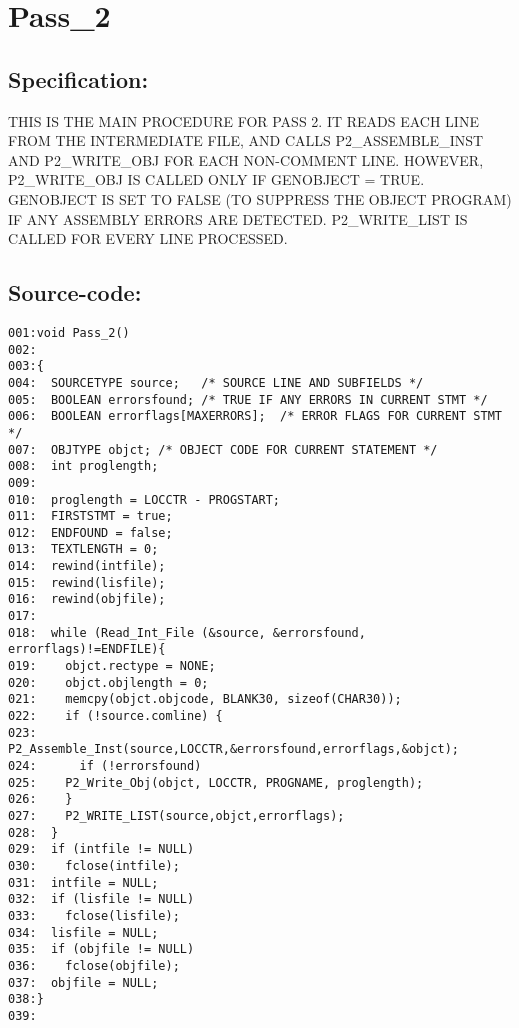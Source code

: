\section{Pass\_2}
\subsection*{Specification:}
THIS IS THE MAIN PROCEDURE FOR PASS 2. IT READS EACH LINE FROM THE
INTERMEDIATE FILE, AND CALLS P2\_ASSEMBLE\_INST AND P2\_WRITE\_OBJ FOR EACH
NON-COMMENT LINE. HOWEVER, P2\_WRITE\_OBJ IS CALLED ONLY IF GENOBJECT =
TRUE. GENOBJECT IS SET TO FALSE (TO SUPPRESS THE OBJECT PROGRAM) IF ANY
ASSEMBLY ERRORS ARE DETECTED. P2\_WRITE\_LIST IS CALLED FOR EVERY LINE
PROCESSED.
\subsection*{Source-code:}
\begin{verbatim}
001:void Pass_2()
002:
003:{
004:  SOURCETYPE source;   /* SOURCE LINE AND SUBFIELDS */
005:  BOOLEAN errorsfound; /* TRUE IF ANY ERRORS IN CURRENT STMT */
006:  BOOLEAN errorflags[MAXERRORS];  /* ERROR FLAGS FOR CURRENT STMT */
007:  OBJTYPE objct; /* OBJECT CODE FOR CURRENT STATEMENT */
008:  int proglength;
009:
010:  proglength = LOCCTR - PROGSTART;
011:  FIRSTSTMT = true;
012:  ENDFOUND = false;
013:  TEXTLENGTH = 0;
014:  rewind(intfile);
015:  rewind(lisfile);
016:  rewind(objfile);
017:
018:  while (Read_Int_File (&source, &errorsfound, errorflags)!=ENDFILE){
019:    objct.rectype = NONE;
020:    objct.objlength = 0;
021:    memcpy(objct.objcode, BLANK30, sizeof(CHAR30));
022:    if (!source.comline) {
023:      P2_Assemble_Inst(source,LOCCTR,&errorsfound,errorflags,&objct);
024:      if (!errorsfound)
025:    P2_Write_Obj(objct, LOCCTR, PROGNAME, proglength);
026:    }
027:    P2_WRITE_LIST(source,objct,errorflags);
028:  }
029:  if (intfile != NULL)
030:    fclose(intfile);
031:  intfile = NULL;
032:  if (lisfile != NULL)
033:    fclose(lisfile);
034:  lisfile = NULL;
035:  if (objfile != NULL)
036:    fclose(objfile);
037:  objfile = NULL;
038:}
039:
\end{verbatim}
